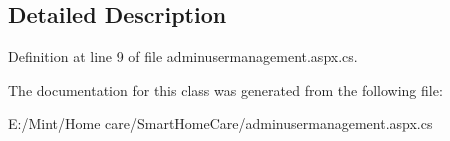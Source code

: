 \subsection{Detailed Description}


Definition at line 9 of file adminusermanagement.\-aspx.\-cs.



The documentation for this class was generated from the following file\-:\begin{DoxyCompactItemize}
\item 
E\-:/\-Mint/\-Home care/\-Smart\-Home\-Care/adminusermanagement.\-aspx.\-cs\end{DoxyCompactItemize}

